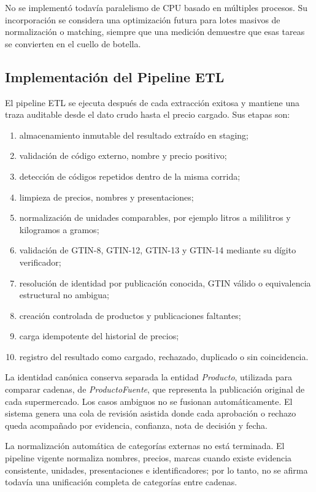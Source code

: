 No se implementó todavía paralelismo de CPU basado en múltiples procesos. Su
incorporación se considera una optimización futura para lotes masivos de
normalización o matching, siempre que una medición demuestre que esas tareas se
convierten en el cuello de botella.

\subsection{Implementación del Pipeline ETL}

El pipeline ETL se ejecuta después de cada extracción exitosa y mantiene una
traza auditable desde el dato crudo hasta el precio cargado. Sus etapas son:

\begin{enumerate}
    \item almacenamiento inmutable del resultado extraído en staging;
    \item validación de código externo, nombre y precio positivo;
    \item detección de códigos repetidos dentro de la misma corrida;
    \item limpieza de precios, nombres y presentaciones;
    \item normalización de unidades comparables, por ejemplo litros a
    mililitros y kilogramos a gramos;
    \item validación de GTIN-8, GTIN-12, GTIN-13 y GTIN-14 mediante su dígito
    verificador;
    \item resolución de identidad por publicación conocida, GTIN válido o
    equivalencia estructural no ambigua;
    \item creación controlada de productos y publicaciones faltantes;
    \item carga idempotente del historial de precios;
    \item registro del resultado como cargado, rechazado, duplicado o sin
    coincidencia.
\end{enumerate}

La identidad canónica conserva separada la entidad \textit{Producto}, utilizada
para comparar cadenas, de \textit{ProductoFuente}, que representa la publicación
original de cada supermercado. Los casos ambiguos no se fusionan automáticamente.
El sistema genera una cola de revisión asistida donde cada aprobación o rechazo
queda acompañado por evidencia, confianza, nota de decisión y fecha.

La normalización automática de categorías externas no está terminada. El
pipeline vigente normaliza nombres, precios, marcas cuando existe evidencia
consistente, unidades, presentaciones e identificadores; por lo tanto, no se
afirma todavía una unificación completa de categorías entre cadenas.


